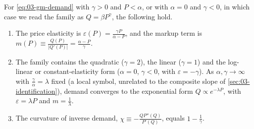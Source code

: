 \begin{lemma}\label{lem:03-gm-demand}
For \eqref{eq:03-gm-demand} with $\gamma > 0$ and $P < \alpha$, or with $\alpha = 0$ and $\gamma < 0$, in which case
we read the family as $Q = \beta P^{\gamma}$, the following hold.
\begin{enumerate}[label=(\roman*)]
\item The price elasticity is $\varepsilon(P) = \frac{\gamma P}{\alpha - P}$, and the markup term is
$m(P) \equiv \frac{Q(P)}{\lvert Q'(P)\rvert} = \frac{\alpha - P}{\gamma}$.
\item The family contains the quadratic ($\gamma = 2$), the linear ($\gamma = 1$) and the log-linear or
constant-elasticity form ($\alpha = 0$, $\gamma < 0$, with $\varepsilon = -\gamma$). As $\alpha, \gamma \to
\infty$ with $\frac{\gamma}{\alpha} = \lambda$ fixed (a local symbol, unrelated to the composite slope of
\cref{sec:03-identification}), demand converges to the exponential form
$Q \propto e^{-\lambda P}$, with $\varepsilon = \lambda P$ and $m = \frac{1}{\lambda}$.
\item The curvature of inverse demand, $\chi \equiv -\frac{Q P''(Q)}{P'(Q)}$, equals $1 - \frac{1}{\gamma}$.
\end{enumerate}
\end{lemma}

